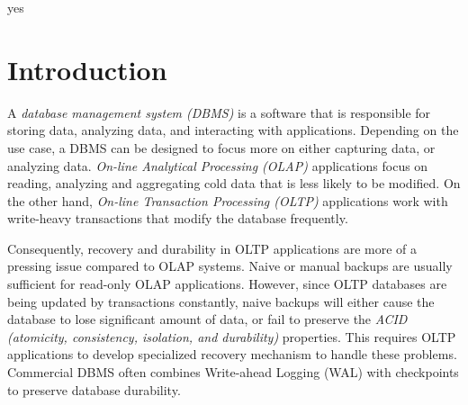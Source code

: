 \documentclass[12pt]{cmuthesis}
\begin{document}
\begin{acknowledgments}
yes
\end{acknowledgments}



\tableofcontents
\listoffigures
\listoftables

\mainmatter


%
%
%
%
%


\chapter{Introduction}
A \textit{database management system (DBMS)} is a software that is responsible for storing data, analyzing data, and interacting with applications. Depending on the use case, a DBMS can be designed to focus more on either capturing data, or analyzing data. \textit{On-line Analytical Processing (OLAP)} applications focus on reading, analyzing and aggregating cold data that is less likely to be modified. On the other hand, \textit{On-line Transaction Processing (OLTP)} applications work with write-heavy transactions that modify the database frequently.

Consequently, recovery and durability in OLTP applications are more of a pressing issue compared to OLAP systems. Naive or manual backups are usually sufficient for read-only OLAP applications. However, since OLTP databases are being updated by transactions constantly, naive backups will either cause the database to lose significant amount of data, or fail to preserve the \textit{ACID (atomicity, consistency, isolation, and durability)} properties. This requires OLTP applications to develop specialized recovery mechanism to handle these problems. Commercial DBMS often combines Write-ahead Logging (WAL) with checkpoints to preserve database durability.
\end{document}
